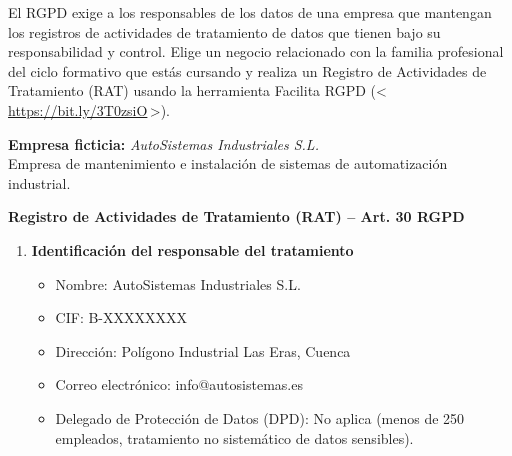 {
	El RGPD exige a los responsables de los datos de una empresa que mantengan los registros de
	actividades de tratamiento de datos que tienen bajo su responsabilidad y control. Elige un
	negocio relacionado con la familia profesional del ciclo formativo que estás cursando y realiza
	un Registro de Actividades de Tratamiento (RAT) usando la herramienta Facilita RGPD
	(\textless\,\url{https://bit.ly/3T0zsiO}\,\textgreater).
}

\begin{solution}

	\textbf{Empresa ficticia:} \textit{AutoSistemas Industriales S.L.} \\
	Empresa de mantenimiento e instalación de sistemas de automatización industrial.

	\medskip

	\textbf{Registro de Actividades de Tratamiento (RAT) -- Art. 30 RGPD}

	\medskip

	\begin{enumerate}[label=\textbf{\arabic*.}]

		\item \textbf{Identificación del responsable del tratamiento}
		      \begin{itemize}
			      \item Nombre: AutoSistemas Industriales S.L.
			      \item CIF: B-XXXXXXXX
			      \item Dirección: Polígono Industrial Las Eras, Cuenca
			      \item Correo electrónico: info@autosistemas.es
			      \item Delegado de Protección de Datos (DPD): No aplica (menos de 250 empleados,
			            tratamiento no sistemático de datos sensibles).
		      \end{itemize}


\end{enumerate}
\end{solution}
